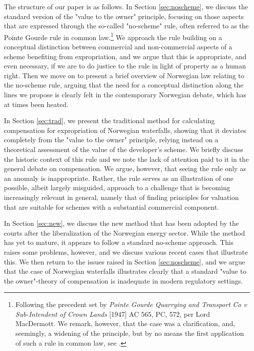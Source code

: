 The structure of our paper is as follows. In Section \ref{sec:noscheme}, we discuss the standard version of the "value to the owner" principle, focusing on those aspects that are expressed through the so-called "no-scheme" rule, often referred to as the Pointe Gourde rule in common law.\footnote{Following the precedent set by \emph{Pointe Gourde Quarrying and Transport Co v Sub-Intendent of Crown Lands} [1947] AC 565,
PC, 572, per Lord MacDermott. We remark, however, that the case was a clarification, and, seemingly, a widening of the principle, but by no means the first application of such a rule in common law, see \cite{lcdisc} .} We approach the rule building on a conceptual distinction between commercial and non-commercial aspects of a scheme benefiting from expropriation, and we argue that this is appropriate, and even necessary, if we are to do justice to the rule in light of property as a human right. Then we move on to present a brief overview of Norwegian law relating to the no-scheme rule, arguing that the need for a conceptual distinction along the lines we propose is clearly felt in the contemporary Norwegian debate, which has at times been heated.

In Section \ref{sec:trad}, we present the traditional method for calculating compensation for expropriation of Norwegian waterfalls, showing that it deviates completely from the "value to the owner" principle, relying instead on a theoretical assessment of the value of the developer's scheme. We briefly discuss the historic context of this rule and we note the lack of attention paid to it in the general debate on compensation. We argue, however, that seeing the rule only as an anomaly is inappropriate. Rather, the rule serves as an illustration of one possible, albeit largely misguided, approach to a challenge that is becoming increasingly relevant in general, namely that of finding principles for valuation that are suitable for schemes with a substantial commercial component. 

In Section \ref{sec:new}, we discuss the new method that has been adopted by the courts after the liberalization of the Norwegian energy sector. While the method has yet to mature, it appears to follow a standard no-scheme approach. This raises some problems, however, and we discuss various recent cases that illustrate this. We then return to the issues raised in Section \ref{sec:noscheme}, and we argue that the case of Norwegian waterfalls illustrates clearly that a standard "value to the owner"-theory of compensation is inadequate in modern regulatory settings. 

